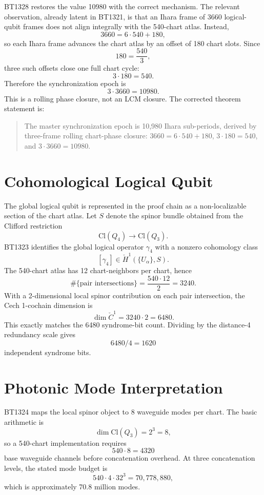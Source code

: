 \documentclass[11pt]{article}
\newcommand{\Qfour}{Q_4}
\newcommand{\Qthree}{Q_3}
\newcommand{\Cech}{\check{C}}
\newcommand{\Hcech}{\check{H}}
\begin{document}
BT1328 restores the value 10980 with the correct mechanism.  The relevant observation, already latent in BT1321, is that an Ihara frame of 3660 logical-qubit frames does not align integrally with the 540-chart atlas.  Instead,
\[
3660=6\cdot540+180,
\]
so each Ihara frame advances the chart atlas by an offset of 180 chart slots.  Since
\[
180=\frac{540}{3},
\]
three such offsets close one full chart cycle:
\[
3\cdot180=540.
\]
Therefore the synchronization epoch is
\[
3\cdot3660=10980.
\]
This is a rolling phase closure, not an LCM closure.  The corrected theorem statement is:
\begin{quote}
The master synchronization epoch is 10,980 Ihara sub-periods, derived by three-frame rolling chart-phase closure: \(3660=6\cdot540+180\), \(3\cdot180=540\), and \(3\cdot3660=10980\).
\end{quote}

\section{Cohomological Logical Qubit}

The global logical qubit is represented in the proof chain as a non-localizable section of the chart atlas.  Let \(S\) denote the spinor bundle obtained from the Clifford restriction
\[
\mathrm{Cl}(\Qfour)\to\mathrm{Cl}(\Qthree).
\]
BT1323 identifies the global logical operator \(\gamma_4\) with a nonzero cohomology class
\[
[\gamma_4]\in \Hcech^1(\{U_\alpha\},S).
\]
The 540-chart atlas has 12 chart-neighbors per chart, hence
\[
\#\{\text{pair intersections}\}=\frac{540\cdot12}{2}=3240.
\]
With a 2-dimensional local spinor contribution on each pair intersection, the Cech 1-cochain dimension is
\[
\dim \Cech^1=3240\cdot2=6480.
\]
This exactly matches the 6480 syndrome-bit count.  Dividing by the distance-4 redundancy scale gives
\[
6480/4=1620
\]
independent syndrome bits.

\section{Photonic Mode Interpretation}

BT1324 maps the local spinor object to 8 waveguide modes per chart.  The basic arithmetic is
\[
\dim \mathrm{Cl}(\Qthree)=2^3=8,
\]
so a 540-chart implementation requires
\[
540\cdot8=4320
\]
base waveguide channels before concatenation overhead.  At three concatenation levels, the stated mode budget is
\[
540\cdot4\cdot32^3=70,778,880,
\]
which is approximately 70.8 million modes.
\end{document}
